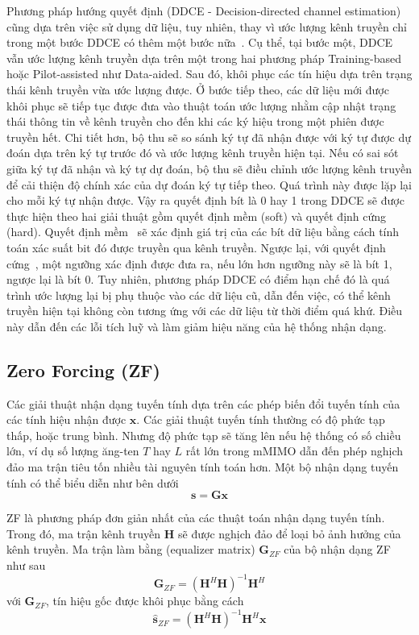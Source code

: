 Phương pháp hướng quyết định (DDCE - Decision-directed channel estimation) cũng dựa trên việc sử dụng dữ liệu, tuy nhiên, thay vì ước lượng kênh truyền chỉ trong một bước DDCE có thêm một bước nữa~\cite{vilas2022}. Cụ thể, tại bước một, DDCE vẫn ước lượng kênh truyền dựa trên một trong hai phương pháp Training-based hoặc Pilot-assisted như Data-aided. Sau đó, khôi phục các tín hiệu dựa trên trạng thái kênh truyền vừa ước lượng được. Ở bước tiếp theo, các dữ liệu mới được khôi phục sẽ tiếp tục được đưa vào thuật toán ước lượng nhằm cập nhật trạng thái thông tin về kênh truyền cho đến khi các ký hiệu trong một phiên được truyền hết. Chi tiết hơn, bộ thu sẽ so sánh ký tự đã nhận được với ký tự được dự đoán dựa trên ký tự trước đó và ước lượng kênh truyền hiện tại. Nếu có sai sót giữa ký tự đã nhận và ký tự dự đoán, bộ thu sẽ điều chỉnh ước lượng kênh truyền để cải thiện độ chính xác của dự đoán ký tự tiếp theo. Quá trình này được lặp lại cho mỗi ký tự nhận được. Vậy ra quyết định bít là 0 hay 1 trong DDCE sẽ được thực hiện theo hai giải thuật gồm quyết định mềm (soft) và quyết định cứng (hard). Quyết định mềm~\cite{Park2015} sẽ xác định giá trị của các bít dữ liệu bằng cách tính toán xác suất bit đó được truyền qua kênh truyền. Ngược lại, với quyết định cứng~\cite{Kai2005}, một ngưỡng xác định được đưa ra, nếu lớn hơn ngưỡng này sẽ là bít 1, ngược lại là bít 0. Tuy nhiên, phương pháp DDCE có điểm hạn chế đó là quá trình ước lượng lại bị phụ thuộc vào các dữ liệu cũ, dẫn đến việc, có thể kênh truyền hiện tại không còn tương ứng với các dữ liệu từ thời điểm quá khứ. Điều này dẫn đến các lỗi tích luỹ và làm giảm hiệu năng của hệ thống nhận dạng.

\subsection{Zero Forcing (ZF)} \label{sec:zf}

Các giải thuật nhận dạng tuyến tính dựa trên các phép biến đổi tuyến tính của các tính hiệu nhận được $\mathbf{x}$. Các giải thuật tuyến tính thường có độ phức tạp thấp, hoặc trung bình. Nhưng độ phức tạp sẽ tăng lên nếu hệ thống có số chiều lớn, ví dụ số lượng ăng-ten $T$ hay $L$ rất lớn trong mMIMO dẫn đến phép nghịch đảo ma trận tiêu tốn nhiều tài nguyên tính toán hơn. Một bộ nhận dạng tuyến tính có thể biểu diễn như bên dưới
\begin{equation}
    \mathbf{s} = \mathbf{G} \mathbf{x}
\end{equation}

ZF là phương pháp đơn giản nhất của các thuật toán nhận dạng tuyến tính. Trong đó, ma trận kênh truyền $\mathbf{H}$ sẽ được nghịch đảo để loại bỏ ảnh hưởng của kênh truyền. Ma trận làm bằng (equalizer matrix) $\mathbf{G}_{ZF}$ của bộ nhận dạng ZF như sau
\begin{equation}
    \mathbf{G}_{ZF}=\left(\mathbf{H}^H \mathbf{H}\right)^{-1} \mathbf{H}^H
\end{equation}
với $\mathbf{G}_{ZF}$, tín hiệu gốc được khôi phục bằng cách
\begin{equation}
    \hat{\mathbf{s}}_{ZF}=\left(\mathbf{H}^H \mathbf{H}\right)^{-1} \mathbf{H}^H \mathbf{x}
\end{equation}

